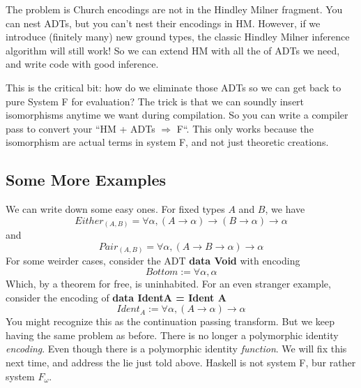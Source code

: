 \documentclass[12pt]{article}
\begin{document}
The problem is Church encodings are not in the Hindley Milner fragment.
You can nest ADTs, but you can't nest their encodings in HM.
However, if we introduce (finitely many) new ground types, the classic Hindley Milner inference algorithm will still work!
So we can extend HM with all the of ADTs we need, and write code with good inference. 

This is the critical bit: how do we eliminate those ADTs so we can get back to pure System F for evaluation?
The trick is that we can soundly insert isomorphisms anytime we want during compilation.
So you can write a compiler pass to convert your ``HM + ADTs $\Rightarrow$ F``.
This only works because the isomorphism are actual terms in system F, and not just theoretic creations.

\subsection{Some More Examples}
We can write down some easy ones.
For fixed types $A$ and $B$, we have
\[
Either_{(A,B)} = \forall \alpha, (A \rightarrow \alpha) \rightarrow (B \rightarrow \alpha) \rightarrow \alpha
\]
and 
\[
Pair_{(A,B)} = \forall \alpha, (A \rightarrow B \rightarrow \alpha) \rightarrow \alpha
\]
For some weirder cases, consider the ADT \textbf{data Void} with encoding
\[
  Bottom := \forall \alpha, \alpha
\]
Which, by a theorem for free, is uninhabited.
For an even stranger example, consider the encoding of \textbf{data IdentA = Ident A} 
\[
  Ident_A := \forall \alpha, (A \rightarrow \alpha) \rightarrow \alpha
\]
You might recognize this as the continuation passing transform.
But we keep having the same problem as before.
There is no longer a polymorphic identity \textit{encoding}.
Even though there is a polymorphic identity \textit{function}.
We will fix this next time, and address the lie just told above.
Haskell is not system F, bur rather system $F_\omega$.
\end{document}
